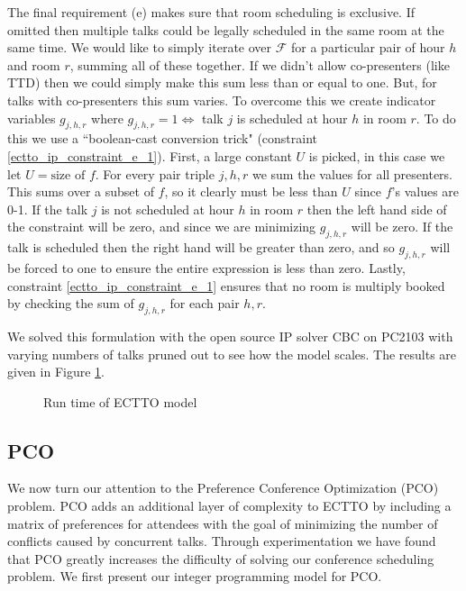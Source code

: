 \documentclass{svjour3}                     %
\begin{document}
The final requirement (e) makes sure that room scheduling is exclusive. If omitted then multiple talks could be legally scheduled in the same room at the same time. We would like to simply iterate over $\mathcal F$ for a particular pair of hour $h$ and room $r$, summing all of these together. If we didn't allow co-presenters (like TTD) then we could simply make this sum less than or equal to one. But, for talks with co-presenters this sum varies. To overcome this we create indicator variables $g_{j,h,r}$ where $g_{j,h,r}=1 \iff$ talk $j$ is scheduled at hour $h$ in room $r$. To do this we use a ``boolean-cast conversion trick" (constraint \ref{ectto_ip_constraint_e_1}). First, a large constant $U$ is picked, in this case we let $U=\text{size of } f$. For every pair triple $j,h,r$ we sum the values for all presenters. This sums over a subset of $f$, so it clearly must be less than $U$ since $f$'s values are 0-1. If the talk $j$ is not scheduled at hour $h$ in room $r$ then the left hand side of the constraint will be zero, and since we are minimizing $g_{j,h,r}$ will be zero. If the talk is scheduled then the right hand will be greater than zero, and so $g_{j,h,r}$ will be forced to one to ensure the entire expression is less than zero. Lastly, constraint \ref{ectto_ip_constraint_e_1} ensures that no room is multiply booked by checking the sum of $g_{j,h,r}$ for each pair $h,r$.

We solved this formulation with the open source IP solver CBC on PC2103 with varying numbers of talks pruned out to see how the model scales. The results are given in Figure \ref{ectto_run_time}.
\begin{figure}[h!]
	\caption{Run time of ECTTO model}
	\centering
	
	\label{ectto_run_time}
\end{figure}

\subsection{PCO}
We now turn our attention to the Preference Conference Optimization (PCO) problem. PCO adds an additional layer of complexity to ECTTO by including a matrix of preferences for attendees with the goal of minimizing the number of conflicts caused by concurrent talks. Through experimentation we have found that PCO greatly increases the difficulty of solving our conference scheduling problem. We first present our integer programming model for PCO.
\end{document}
